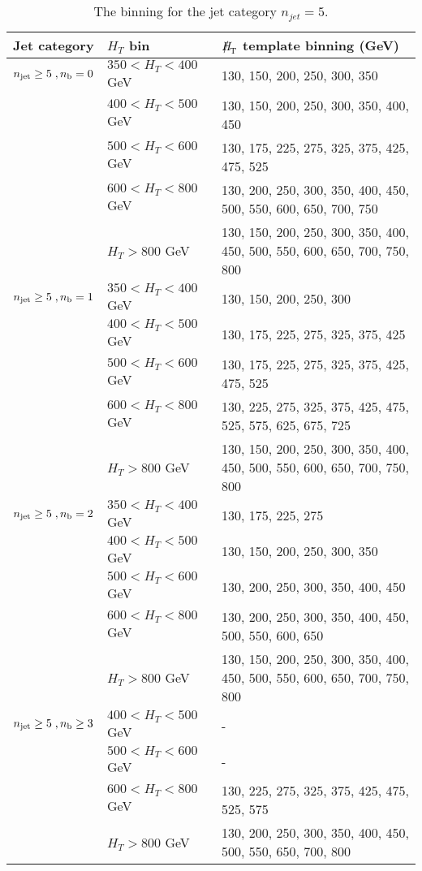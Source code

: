 \begin{table}[h!]
  \scriptsize
  \centering
  \caption{The \MHT binning for the jet category $n_{jet} = 5$. 
  \label{tab:mhtBins_ge5j}}
  \begin{tabular}{ lll }
    Jet category & $H_{T}$ bin & $\MHT$ template binning (GeV) \\ \hline

    \hline
    $n_{\text{jet}} \geq 5 \;, n_{\text{b}} = 0$ & $350 < H_{T} < 400$ GeV & 130, 150, 200, 250, 300, 350 \\ 
     & $400 < H_{T} < 500$ GeV & 130, 150, 200, 250, 300, 350, 400, 450 \\ 
     & $500 < H_{T} < 600$ GeV & 130, 175, 225, 275, 325, 375, 425, 475, 525 \\ 
     & $600 < H_{T} < 800$ GeV & 130, 200, 250, 300, 350, 400, 450, 500, 550, 600, 650, 700, 750 \\ 
     & $H_{T} > 800$ GeV & 130, 150, 200, 250, 300, 350, 400, 450, 500, 550, 600, 650, 700, 750, 800 \\ 
    \hline
    $n_{\text{jet}} \geq 5 \;, n_{\text{b}} = 1$ & $350 < H_{T} < 400$ GeV & 130, 150, 200, 250, 300 \\ 
     & $400 < H_{T} < 500$ GeV & 130, 175, 225, 275, 325, 375, 425 \\ 
     & $500 < H_{T} < 600$ GeV & 130, 175, 225, 275, 325, 375, 425, 475, 525 \\ 
     & $600 < H_{T} < 800$ GeV & 130, 225, 275, 325, 375, 425, 475, 525, 575, 625, 675, 725 \\ 
     & $H_{T} > 800$ GeV & 130, 150, 200, 250, 300, 350, 400, 450, 500, 550, 600, 650, 700, 750, 800 \\ 
    \hline
    $n_{\text{jet}} \geq 5 \;, n_{\text{b}} = 2$ & $350 < H_{T} < 400$ GeV & 130, 175, 225, 275 \\ 
     & $400 < H_{T} < 500$ GeV & 130, 150, 200, 250, 300, 350 \\ 
     & $500 < H_{T} < 600$ GeV & 130, 200, 250, 300, 350, 400, 450 \\ 
     & $600 < H_{T} < 800$ GeV & 130, 200, 250, 300, 350, 400, 450, 500, 550, 600, 650 \\ 
     & $H_{T} > 800$ GeV & 130, 150, 200, 250, 300, 350, 400, 450, 500, 550, 600, 650, 700, 750, 800 \\ 
    \hline
    $n_{\text{jet}} \geq 5 \;, n_{\text{b}} \geq 3$ & $400 < H_{T} < 500$ GeV & - \\ 
     & $500 < H_{T} < 600$ GeV & - \\ 
     & $600 < H_{T} < 800$ GeV & 130, 225, 275, 325, 375, 425, 475, 525, 575 \\ 
     & $H_{T} > 800$ GeV & 130, 200, 250, 300, 350, 400, 450, 500, 550, 650, 700, 800 \\ 

  \end{tabular}
\end{table}



